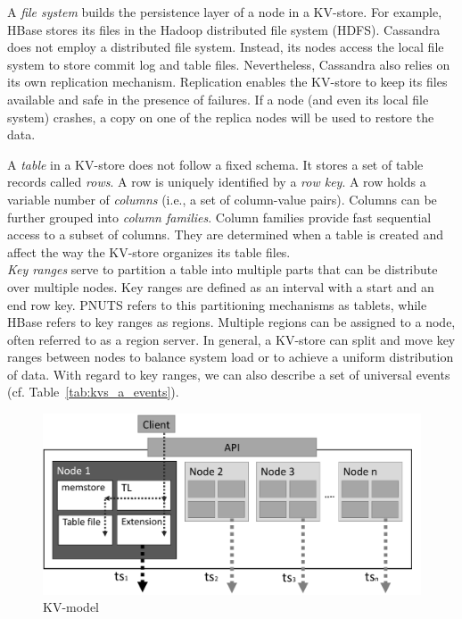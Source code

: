 A \textit{file system} builds the persistence layer of a node in a
KV-store. For example, HBase stores its files in the Hadoop distributed
file system (HDFS). Cassandra does not employ a distributed file system.  
Instead, its nodes access the local file system to store commit log and 
table files. Nevertheless, Cassandra also relies on its own replication 
mechanism. Replication enables the KV-store to keep its files available 
and safe in the presence of failures. If a node (and even its local file 
system) crashes, a copy on one of the replica nodes will be used to restore
the data.  

A \textit{table} in a KV-store does not follow a fixed schema. It stores 
a set of table records called \textit{rows}. A row is uniquely identified by a
\textit{row key}. A row holds a variable number of \textit{columns}
(i.e., a set of column-value pairs). Columns can be further
grouped into \textit{column families}. Column families provide fast
sequential access to a subset of columns. They are determined when a
table is created and affect the way the KV-store organizes its table
files.\\ 
\textit{Key ranges} serve to partition a table into multiple
parts that can be distribute over multiple nodes.  Key ranges are
defined as an interval with a start and an end row key.  PNUTS refers
to this partitioning mechanisms as tablets, while HBase
refers to key ranges as regions. Multiple regions can be
assigned to a node, often referred to as a region server. 
In general, a KV-store can split and move key ranges between nodes to 
balance system load or to achieve a uniform distribution of data. With
regard to key ranges, we can also describe a set of universal events 
(cf. Table~\ref{tab:kvs_a_events}).

%
%

\begin{figure} 
	\centering 
	\includegraphics[width=\linewidth]{figures/KVModel} 
	\caption{KV-model} 
	\label{fig:kv_model} 
\end{figure} 

